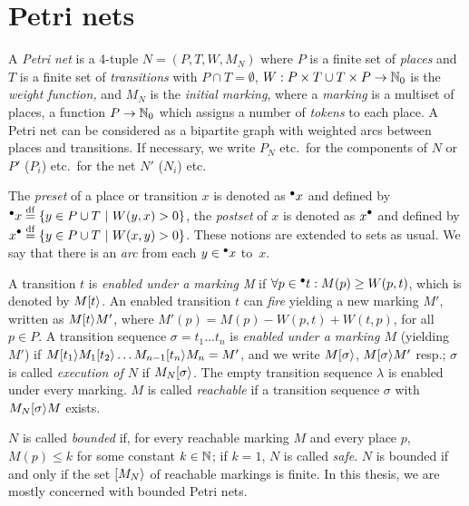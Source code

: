 \section{Petri nets}\label{sec_pn_basic}

A \emph{Petri net} is a 4-tuple $N=(P,T,W,M_N)$ where
$P$ is a finite set of \emph{places} and $T$ is a finite set of \emph{transitions}
with $P \cap T=\emptyset$,
$W: P\times T \cup T \times P \rightarrow \mathbb{N}_0$ is the \emph{weight function,} and
$M_N$ is the \emph{initial marking}, where a \emph{marking} is a multiset of places,
\ie a function $P\rightarrow\mathbb{N}_0$ which assigns a number of \emph{tokens} to each place.
A Petri net can be considered as a bipartite graph with weighted arcs between places and transitions.
If necessary, we write $P_N$ etc.\ for the components of $N$ or $P'$ ($P_i$) etc.\ for the net $N'$ ($N_i$) etc.



The \emph{preset} of a place or transition $x$ is denoted as ${}^\bullet {x}$ and defined by
$\pre x\DEF\{y\in P\cup T\ |\  W(y,x)>0\}$,
the \emph{postset} of $x$ is denoted as $\post x$ and defined by
$\post x\DEF\{y\in P\cup T\ |\ W(x,y)>0\}$.
These notions are extended to sets as usual.
We say that there is an \emph{arc}
from each $y\in {}^\bullet {x}$ to~$x$.





A transition $t$ is \emph{enabled under a marking M}
if $\forall p\in {}^\bullet {t}:M(p)\geq W(p, t)$, which is denoted by $M[t\rangle$.
An enabled transition $t$ can \emph{fire} yielding a new marking $M'$,
written as $M[t\rangle M'$,
where $M'(p)=M(p)-W(p, t) + W(t,p)$, for all $p\in P$.
A transition sequence $\sigma=t_1\ldots t_n$ is \emph{enabled under a marking $M$} (yielding $M'$)
if $M[t_1\rangle M_1[t_2\rangle\ldots M_{n-1}[t_n\rangle M_n=M'$, and we
write $M[\sigma\rangle$, $M[\sigma\rangle M'$ resp.; $\sigma$ is called \emph{execution of $N$} if $M_N[\sigma\rangle$.
  The empty transition sequence $\lambda$ is  enabled under every marking.
$M$ is called \emph{reachable} if a transition sequence $\sigma$ with
$M_N[\sigma\rangle M$ exists.

$N$ is called \emph{bounded} if, for every reachable marking $M$ and every place $p$, $M(p)\leq k$ for some constant $k\in \mathbb{N}$; if $k=1$, $N$ is called \emph{safe}. $N$ is bounded if and only if the set $[M_N\rangle$ of reachable markings is finite. In this thesis, we are mostly concerned with bounded Petri nets.

